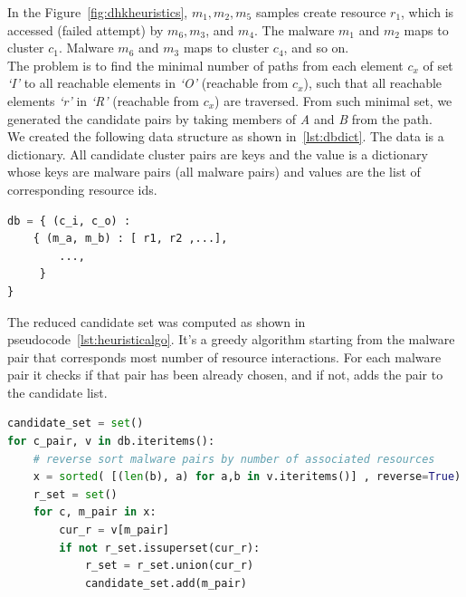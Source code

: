 In the Figure~\ref{fig:dhkheuristics},  $m_1,m_2, m_5$ samples create resource $r_1$, which is accessed (failed attempt) by $m_6, m_3$, and $m_4$.
The malware $m_1$ and $m_2$ maps to cluster $c_1$. Malware $m_6$ and $m_3$ maps to cluster $c_4$, and so on.
\\
The problem is to find the minimal number of paths from each element \emph{$c_x$} of set \emph{`I'} to all reachable elements in \emph{`O'} (reachable from \emph{$c_x$}), such that all reachable elements \emph{`r'} in \emph{`R'} (reachable from \emph{$c_x$}) are traversed. From such minimal set, we generated the candidate pairs by taking members of \emph{A} and \emph{B} from the path.
\\
We created the following data structure as shown in~\ref{lst:dbdict}.
The data is a dictionary. All candidate cluster pairs are keys and the value is a dictionary whose keys are malware pairs (all malware pairs) and values are the list of corresponding resource ids.
\\

\begin{lstlisting}[language=python,floatplacement=htpb,caption={Database Structure},label={lst:dbdict}]
db = { (c_i, c_o) :
    { (m_a, m_b) : [ r1, r2 ,...],
        ...,
     }
}
\end{lstlisting}
The reduced candidate set was computed as shown in pseudocode~\ref{lst:heuristicalgo}.
It's a greedy algorithm starting from the malware pair that corresponds most number of resource interactions.
For each malware pair it checks if that pair has been already chosen, and if not, adds the pair to the candidate list.
\\
\begin{lstlisting}[float,floatplacement=htbp,language=python,caption={Pseudo code (Python) to get minimal set of candidates for all resource},label={lst:heuristicalgo}]
candidate_set = set()
for c_pair, v in db.iteritems():
    # reverse sort malware pairs by number of associated resources
    x = sorted( [(len(b), a) for a,b in v.iteritems()] , reverse=True)
    r_set = set()
    for c, m_pair in x:
        cur_r = v[m_pair]
        if not r_set.issuperset(cur_r):
            r_set = r_set.union(cur_r)
            candidate_set.add(m_pair)
\end{lstlisting}
